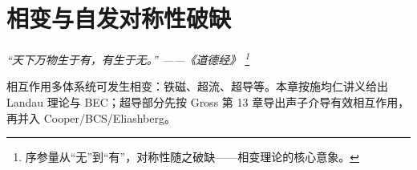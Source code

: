 \chapter{相变与自发对称性破缺}
\renewcommand{\currentchapterpath}{chapters/ch08/}

\begin{flushright}
\textit{“天下万物生于有，有生于无。” ——《道德经》
\footnote{序参量从“无”到“有”，对称性随之破缺——相变理论的核心意象。}}
\end{flushright}

相互作用多体系统可发生相变：铁磁、超流、超导等。本章按施均仁讲义给出 Landau 理论与 BEC；超导部分先按 Gross 第 13 章导出声子介导有效相互作用，再并入 Cooper/BCS/Eliashberg。



